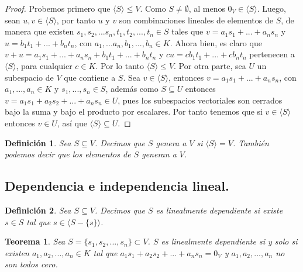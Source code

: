 \documentclass{book}
\newtheorem{theorem}{Teorema}
\newtheorem{definition}{Definición}
\begin{document}
\begin{proof}
Probemos primero que $\langle S \rangle \leq V$. Como $S \neq \emptyset$, al menos $0_V \in \langle S \rangle$. Luego, sean $u,v \in \langle S \rangle$, por tanto $u$ y $v$ son combinaciones lineales de elementos de $S$, de manera que existen $s_1,s_2,...s_n,t_1,t_2,...,t_n \in S$ tales que $v=a_1s_1+...+a_ns_n$ y $u=b_1t_1+...+b_nt_n$, con $a_1,...a_n,b_1,...,b_n \in K$. Ahora bien, es claro que $v+u=a_1s_1+...+a_ns_n+b_1t_1+...+b_nt_n$ y $cu=cb_1t_1+...+cb_nt_n$ pertenecen a $\langle S \rangle$, para cualquier $c \in K$. Por lo tanto $\langle S \rangle \leq V$.\newline \newline
Por otra parte, sea $U$ un subespacio de $V$ que contiene a $S$. Sea $v \in \langle S \rangle$, entonces $v=a_1s_1+...+a_ns_n$, con $a_1,...,a_n \in K$ y $s_1,...,s_n \in S$, además como $S \subseteq U$ entonces $v=a_1s_1+a_2s_2+...+a_ns_n \in U$, pues los subespacios vectoriales son cerrados bajo la suma y bajo el producto por escalares. Por tanto tenemos que si $v \in \langle S \rangle$ entonces $v \in U$, así que $\langle S \rangle \subseteq U$.
\end{proof}

\begin{definition}
Sea $S \subseteq V$. Decimos que $S$ genera a $V$ si $\langle S \rangle = V$. También podemos decir que los elementos de $S$ generan a $V$.
\end{definition}

\subsection{Dependencia e independencia lineal.}

\begin{definition}
Sea $S\subseteq V$. Decimos que $S$ es linealmente dependiente si existe $s \in S$ tal que $s \in \langle S-\{s\} \rangle$.
\end{definition}

\begin{theorem}
Sea $S=\{s_1,s_2,...,s_n\}\subset V$. $S$ es linealmente dependiente si y solo si existen $a_1,a_2,...,a_n \in K$ tal que $a_1s_1+a_2s_2+...+a_ns_n=0_V$ y $a_1,a_2,...,a_n $ no son todos cero.
\end{theorem}
\end{document}
